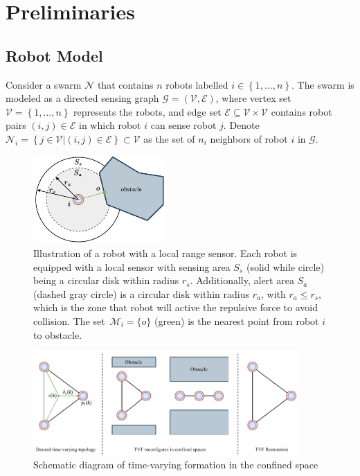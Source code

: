 \section{Preliminaries}\label{sec2}
\subsection{Robot Model}
Consider a swarm $\mathcal{N}$ that contains $n$ robots labelled $i\in\left\{1,...,n\right\}$. The swarm is modeled as a directed sensing graph $\mathcal{G}=\left(\mathcal{V},\mathcal{E}\right)$, where vertex set $\mathcal{V} = \left\{1,..., n\right\}$ represents the robots, and edge set $\mathcal{E}\subseteq\mathcal{V}\times \mathcal{V}$ contains robot pairs $\left(i, j\right)\in\mathcal{E}$ in which robot $i$ can sense robot $j$. Denote $\mathcal{N}_i=\left\{j\in\mathcal{V}|\left(i,j\right)\in\mathcal{E}\right\}\subset\mathcal{V}$ as the set of $n_i$ neighbors of robot $i$ in $\mathcal{G}$.

\begin{figure}
    \centering
    \includegraphics[width=0.45\textwidth]{paper2/images/model.pdf}
    \caption{Illustration of a robot with a local range sensor. Each robot is equipped with a local sensor with sensing area $S_s$ (solid while circle) being a circular disk within radius $r_s$. Additionally, alert area $S_a$ (dashed gray circle) is a circular disk within radius $r_a$, with $r_a\leq r_s$, which is the zone that robot will active the repulsive force to avoid collision. The set~$\mathcal{M}_i=\{o\}$ (green) is the nearest point from robot $i$ to obstacle.}
    \label{fig:1model}
\end{figure}

\begin{figure}
    \centering
    \includegraphics[width=0.9\textwidth]{paper2/images/problem.pdf}
    \caption{Schematic diagram of time-varying formation in the confined space}
    \label{fig:1problem}
\end{figure}

